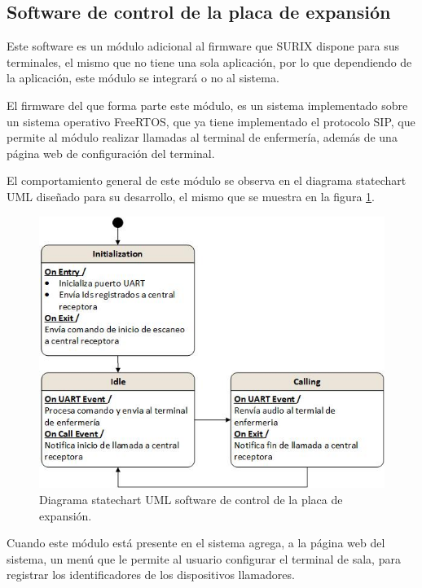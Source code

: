 \subsection{Software de control de la placa de expansión}
\label{subsec:SoftControl}

Este software es un módulo adicional al firmware que SURIX dispone para sus terminales, el mismo que no tiene una sola aplicación, por lo que dependiendo de la aplicación, este módulo se integrará o no al sistema.

El firmware del que forma parte este módulo, es un sistema implementado sobre un sistema operativo FreeRTOS, que ya tiene implementado el protocolo SIP, que permite al módulo realizar llamadas al terminal de enfermería, además de una página web de configuración del terminal.

El comportamiento general de este módulo se observa en el diagrama statechart UML diseñado para su desarrollo, el mismo que se muestra en la figura \ref{fig:DiagramaSoftControl}.

\begin{figure}[htpb]
	\centering
	\includegraphics[scale=0.8]{./Figures/Dcontrol.jpeg}
	\caption{Diagrama statechart UML software de control de la placa de expansión.}
	\label{fig:DiagramaSoftControl}
\end{figure}

Cuando este módulo está presente en el sistema agrega, a la página web del sistema, un menú que le permite al usuario configurar el terminal de sala, para registrar los identificadores de los dispositivos llamadores.

